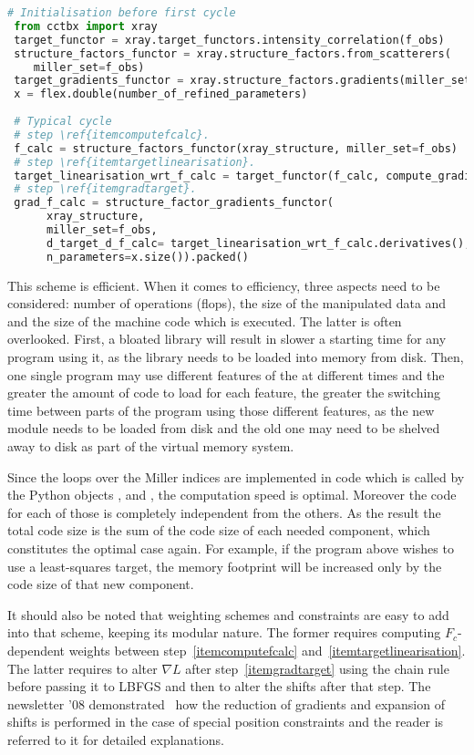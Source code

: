 \documentclass[12pt]{article}
\begin{document}
 \begin{lstlisting}[language=Python]
 # Initialisation before first cycle
 from cctbx import xray
 target_functor = xray.target_functors.intensity_correlation(f_obs)
 structure_factors_functor = xray.structure_factors.from_scatterers(
 	miller_set=f_obs)
 target_gradients_functor = xray.structure_factors.gradients(miller_set=f_obs)
 x = flex.double(number_of_refined_parameters)
 
 # Typical cycle
 # step \ref{itemcomputefcalc}.
 f_calc = structure_factors_functor(xray_structure, miller_set=f_obs)
 # step \ref{itemtargetlinearisation}.
 target_linearisation_wrt_f_calc = target_functor(f_calc, compute_gradients=True)
 # step \ref{itemgradtarget}.
 grad_f_calc = structure_factor_gradients_functor(
      xray_structure,
      miller_set=f_obs,
      d_target_d_f_calc= target_linearisation_wrt_f_calc.derivatives(),
      n_parameters=x.size()).packed() 
 \end{lstlisting}
 
 This scheme is efficient. When it comes to efficiency, three aspects need to be considered:
 number of operations (flops), the size of the manipulated data and and the size of the machine code which is executed. The latter is often overlooked. First, a bloated library will result in slower a starting time for any program using it, as the library needs to be loaded into memory from disk. Then, one single program may use different features of the \cctbx at different times and the greater the amount of code to load for each feature, the greater the switching time between parts of the program using those different features, as the new module needs to be loaded from disk and the old one may need to be shelved away to disk as part of the virtual memory system.
 
 Since the loops over the Miller indices are implemented in \cpp code which is called by the Python objects ,  and , the computation speed is optimal. Moreover the \cpp code for each of those is completely independent from the others. As the result the total code size is the sum of the code size of each needed component, which constitutes the optimal case again. For example, if the program above wishes to use a least-squares target, the memory footprint will be increased only by the code size of that new component.
 
It should also be noted that weighting schemes and constraints are easy to add into that scheme, keeping its modular nature. The former requires computing $F_c$-dependent weights between step~\ref{itemcomputefcalc} and~\ref{itemtargetlinearisation}. The latter requires to alter $\nabla L$ after step~\ref{itemgradtarget} using the chain rule before passing it to LBFGS and then to alter the shifts after that step. The \cctbx newsletter '08 demonstrated~\cite{Bourhis:2008} how the reduction of gradients and expansion of shifts is performed in the case of special position constraints and the reader is referred to it for detailed explanations.
 
\end{document}
